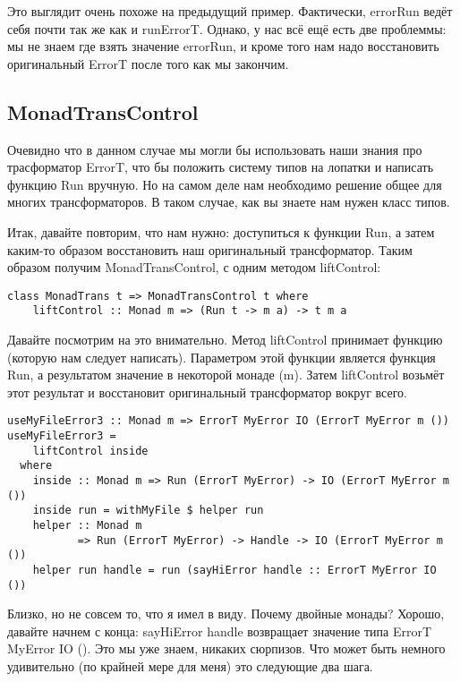 Это выглядит очень похоже на предыдущий пример. Фактически, errorRun ведёт себя почти так же как и runErrorT. Однако, у нас всё ещё есть две проблеммы: мы не знаем где взять значение errorRun, и кроме того нам надо восстановить оригинальный ErrorT после того как мы закончим.

\subsection{MonadTransControl}

Очевидно что в данном случае мы могли бы использовать наши знания про трасформатор ErrorT, что бы положить систему типов на лопатки и написать функцию Run вручную. Но на самом деле нам необходимо решение общее для многих трансформаторов. В таком случае, как вы знаете нам нужен класс типов.

Итак, давайте повторим, что нам нужно: доступиться к функции Run, а затем каким-то образом восстановить наш оригинальный трансформатор. Таким образом получим MonadTransControl, с одним методом liftControl:

\begin{lstlisting}
class MonadTrans t => MonadTransControl t where
    liftControl :: Monad m => (Run t -> m a) -> t m a
\end{lstlisting}

Давайте посмотрим на это внимательно. Метод liftControl принимает функцию (которую нам следует написать). Параметром этой функции является функция Run, а результатом значение в некоторой монаде (m). Затем liftControl возьмёт этот результат и восстановит оригинальный трансформатор вокруг всего.

\begin{lstlisting}
useMyFileError3 :: Monad m => ErrorT MyError IO (ErrorT MyError m ())
useMyFileError3 =
    liftControl inside
  where
    inside :: Monad m => Run (ErrorT MyError) -> IO (ErrorT MyError m ())
    inside run = withMyFile $ helper run
    helper :: Monad m
           => Run (ErrorT MyError) -> Handle -> IO (ErrorT MyError m ())
    helper run handle = run (sayHiError handle :: ErrorT MyError IO ())
\end{lstlisting}

Близко, но не совсем то, что я имел в виду. Почему двойные монады? Хорошо, давайте начнем с конца: sayHiError handle возвращает значение типа ErrorT MyError IO (). Это мы уже знаем, никаких сюрпизов. Что может быть немного удивительно (по крайней мере для меня) это следующие два шага.

